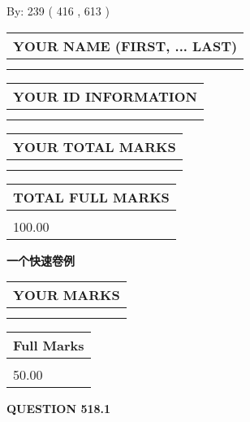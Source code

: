 \documentclass{ctexart}
\begin{document}
   
\hspace{1.0in} By: 
 239 ( 416 ,  613 )
   
   
   
   
\newpage 
\setcounter{page}{ 
   518001 } 
   
   
   
   
\noindent\begin{tabular}{|l|}
\hline
YOUR NAME (FIRST, ... LAST)  \\
\hline
 \\ 
 \\ 
\hline
\end{tabular}
\hspace{0.05in} \begin{tabular}{|l|}
\hline
 YOUR   ID   INFORMATION  \\
\hline
 \\ 
 \\ 
\hline
\end{tabular}
   
   
\vspace{0.2in}\noindent\begin{tabular}{|l|}
\hline
YOUR TOTAL MARKS  \\
\hline
 \\ 
 \\ 
\hline
\end{tabular}
\hspace{0.05in} \begin{tabular}{|l|}
\hline
TOTAL FULL MARKS  \\
\hline
 \\ 
100.00 \\
\hline
\end{tabular}
   
   
 \vspace{0.2in}
{\LARGE {\textbf{ 一个快速卷例}}}
   
   
  
\vspace{0.2in}
  
\noindent\begin{tabular}{|l|}
\hline
 YOUR MARKS  \\
\hline
 \\ 
 \\ 
\hline
\end{tabular}
\hspace{0.05in} \begin{tabular}{|l|}
\hline
 Full Marks  \\
\hline
 \\ 
50.00 \\
\hline
\end{tabular}
{\textbf{\Large{QUESTION
518.1 
}}}
  
\end{document}
